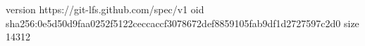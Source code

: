 version https://git-lfs.github.com/spec/v1
oid sha256:0e5d50d9faa0252f5122ceccaccf3078672def8859105fab9df1d2727597c2d0
size 14312
